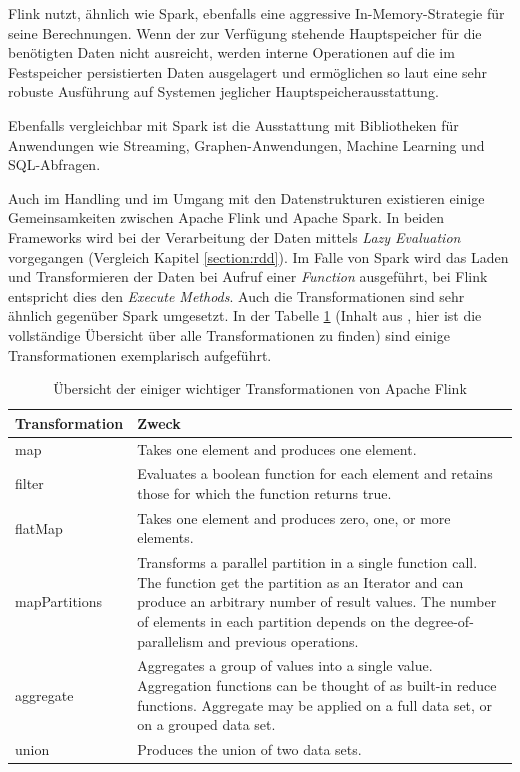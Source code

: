 Flink nutzt, ähnlich wie Spark, ebenfalls eine aggressive In-Memory-Strategie für seine Berechnungen. Wenn der zur Verfügung stehende Hauptspeicher für die benötigten Daten nicht ausreicht, werden interne Operationen auf die im Festspeicher persistierten Daten ausgelagert und ermöglichen so laut  eine sehr robuste Ausführung auf Systemen jeglicher Hauptspeicherausstattung. 

Ebenfalls vergleichbar mit Spark ist die Ausstattung mit Bibliotheken für Anwendungen wie Streaming, Graphen-Anwendungen, Machine Learning und SQL-Abfragen. 

Auch im Handling und im Umgang mit den Datenstrukturen existieren einige Gemeinsamkeiten zwischen Apache Flink und Apache Spark. In beiden Frameworks wird bei der Verarbeitung der Daten mittels \textit{Lazy Evaluation} vorgegangen (Vergleich Kapitel \ref{section:rdd}). Im Falle von Spark wird das Laden und Transformieren der Daten bei Aufruf einer \textit{Function} ausgeführt, bei Flink entspricht dies den \textit{Execute Methods}. Auch die Transformationen sind sehr ähnlich gegenüber Spark umgesetzt. In der Tabelle \ref{tab: flink transformations} (Inhalt aus , hier ist die vollständige Übersicht über alle Transformationen zu finden) sind einige Transformationen exemplarisch aufgeführt. 


\begin{table}[!ht]
\centering
\begin{tabular}{| p{5cm} | p{8cm} | }
\hline
Transformation & Zweck \\ \hline \hline
map & Takes one element and produces one element.  \\ \hline 
filter & Evaluates a boolean function for each element and retains those for which the function returns true. \\ \hline 
flatMap & Takes one element and produces zero, one, or more elements.\\ \hline 
mapPartitions & Transforms a parallel partition in a single function call. The function get the partition as an Iterator and can produce an arbitrary number of result values. The number of elements in each partition depends on the degree-of-parallelism and previous operations. \\ \hline 
aggregate & Aggregates a group of values into a single value. Aggregation functions can be thought of as built-in reduce functions. Aggregate may be applied on a full data set, or on a grouped data set. \\ \hline 
union & Produces the union of two data sets. \\ \hline 

\end{tabular}
\caption{Übersicht der einiger wichtiger Transformationen von Apache Flink}
	\label{tab: flink transformations}
\end{table}


